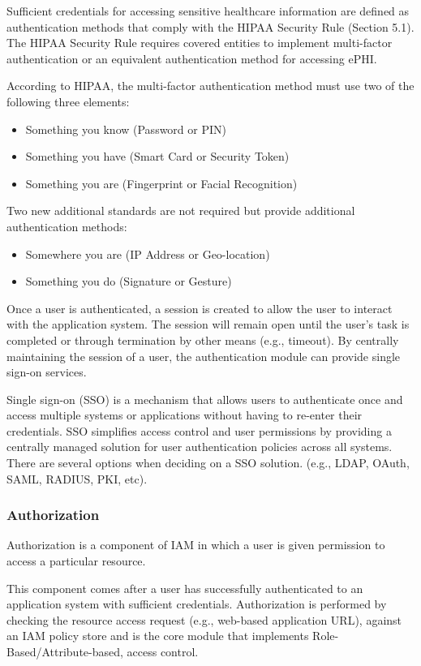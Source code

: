 Sufficient credentials for accessing sensitive healthcare information are defined as authentication methods that comply with the HIPAA Security Rule (Section 5.1). The HIPAA Security Rule requires covered entities to implement multi-factor authentication or an equivalent authentication method for accessing ePHI.

According to HIPAA, the multi-factor authentication method must use two of the following three elements:

\begin{itemize}
    \item Something you know (Password or PIN)
    \item Something you have (Smart Card or Security Token) 
    \item Something you are  (Fingerprint or Facial Recognition)
\end{itemize}

Two new additional standards are not required but provide additional authentication methods:

\begin{itemize}
    \item Somewhere you are (IP Address or Geo-location)
    \item Something you do (Signature or Gesture)
\end{itemize}

Once a user is authenticated, a session is created to allow the user to interact with the application system. The session will remain open until the user's task is completed or through termination by other means (e.g., timeout). By centrally maintaining the session of a user, the authentication module can provide single sign-on services. 

Single sign-on (SSO) is a mechanism that allows users to authenticate once and access multiple systems or applications without having to re-enter their credentials. SSO simplifies access control and user permissions by providing a centrally managed solution for user authentication policies across all systems. There are several options when deciding on a SSO solution. (e.g., LDAP, OAuth, SAML, RADIUS, PKI, etc).

\subsubsection{Authorization}
Authorization is a component of IAM in which a user is given permission to access a particular resource. 

This component comes after a user has successfully authenticated to an application system with sufficient credentials. Authorization is performed by checking the resource access request (e.g., web-based application URL), against an IAM policy store and is the core module that implements Role-Based/Attribute-based, access control. 

